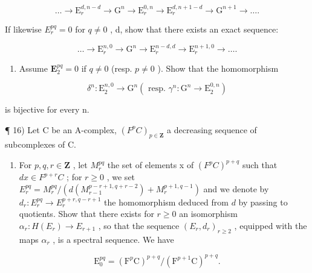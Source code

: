 \[
\dots \rightarrow \mathrm{E} _ {r} ^ {d, n - d} \rightarrow \mathrm{G} ^ {n} \rightarrow \mathrm{E} _ {r} ^ {0, n} \rightarrow \mathrm{E} _ {r} ^ {d, n + 1 - d} \rightarrow \mathrm{G} ^ {n + 1} \rightarrow \dots .
\]

If likewise \(E_{r}^{pq} = 0\) for \(q \neq 0\) , d, show that there exists an exact sequence:

\[
\dots \rightarrow \mathrm{E} _ {r} ^ {n, 0} \rightarrow \mathrm{G} ^ {n} \rightarrow \mathrm{E} _ {r} ^ {n - d, d} \rightarrow \mathrm{E} _ {r} ^ {n + 1, 0} \rightarrow \dots .
\]

\begin{enumerate}
\def\labelenumi{\alph{enumi})}
\setcounter{enumi}{5}
\tightlist
\item
  Assume \(\mathbf{E}_2^{pq} = 0\) if \(q \neq 0\) (resp. \(p \neq 0\) ). Show that the homomorphism
\end{enumerate}

\[
\delta^ {n}: \mathrm{E} _ {2} ^ {n, 0} \rightarrow \mathrm{G} ^ {n} (\text { resp. } \gamma^ {n}: \mathrm{G} ^ {n} \rightarrow \mathrm{E} _ {2} ^ {0, n})
\]

is bijective for every n.

¶ 16) Let C be an A-complex, \((F^{p}C)_{p\in\mathbf{Z}}\) a decreasing sequence of subcomplexes of C.

\begin{enumerate}
\def\labelenumi{\alph{enumi})}
\tightlist
\item
  For \(p,q,r\in\mathbf{Z}\) , let \(M_{r}^{pq}\) the set of elements x of \((F^{p}C)^{p+q}\) such that \(dx\in F^{p+r}C\) ; for \(r\geqslant0\) , we set \(E_{r}^{pq}=M_{r}^{pq}/(d(M_{r-1}^{p-r+1,q+r-2})+M_{r}^{p+1,q-1})\) and we denote by \(d_{r}:E_{r}^{pq}\to E_{r}^{p+r,q-r+1}\) the homomorphism deduced from \(d\) by passing to quotients. Show that there exists for \(r\geqslant0\) an isomorphism \(\alpha_{r}:H(E_{r})\to E_{r+1}\) , so that the sequence \((E_{r},d_{r})_{r\geqslant2}\) , equipped with the maps \(\alpha_{r}\) , is a spectral sequence. We have
\end{enumerate}

\[
\mathrm{E} _ {0} ^ {p q} = (\mathrm{F} ^ {p} \mathrm{C}) ^ {p + q} / (\mathrm{F} ^ {p + 1} \mathrm{C}) ^ {p + q}.
\]

